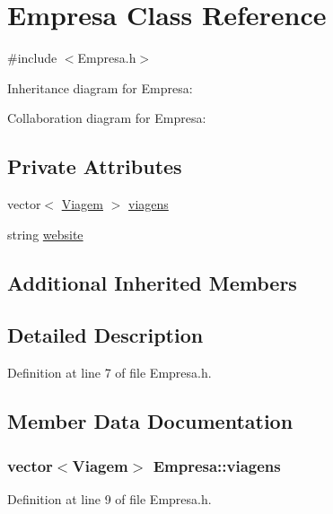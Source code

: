 \hypertarget{class_empresa}{\section{Empresa Class Reference}
\label{class_empresa}
}


{\ttfamily \#include $<$Empresa.\+h$>$}



Inheritance diagram for Empresa\+:


Collaboration diagram for Empresa\+:
\subsection*{Private Attributes}
\begin{DoxyCompactItemize}
\item 
vector$<$ \hyperlink{class_viagem}{Viagem} $>$ \hyperlink{class_empresa_a922a041abeb39daf38135963dbe821f5}{viagens}
\item 
string \hyperlink{class_empresa_a809624b98d1db18f8627ce2fa394dddd}{website}
\end{DoxyCompactItemize}
\subsection*{Additional Inherited Members}


\subsection{Detailed Description}


Definition at line 7 of file Empresa.\+h.



\subsection{Member Data Documentation}
\hypertarget{class_empresa_a922a041abeb39daf38135963dbe821f5}{
\subsubsection[{viagens}]{\setlength{\rightskip}{0pt plus 5cm}vector$<${\bf Viagem}$>$ Empresa\+::viagens\hspace{0.3cm}{\ttfamily [private]}}}\label{class_empresa_a922a041abeb39daf38135963dbe821f5}


Definition at line 9 of file Empresa.\+h.

